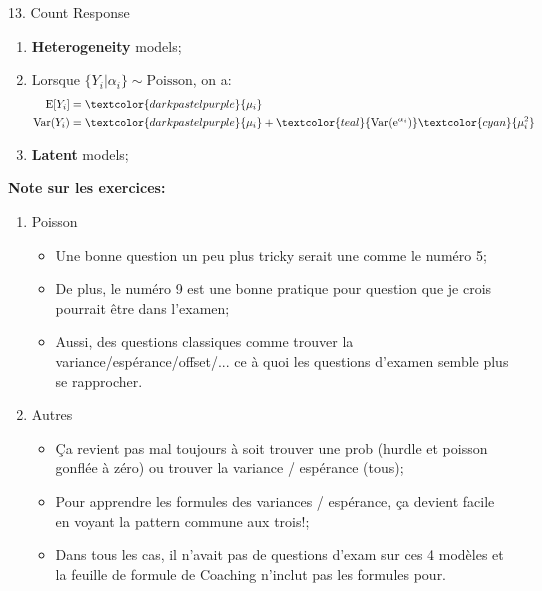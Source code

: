 \documentclass[12pt, titlepage, french]{report}
\begin{document}
\begin{CHPT_SUMM}{13. Count Response}
\begin{enumerate}
\begin{enumerate}
\begin{align*}
			&\text{De plus, on trouve: } \\
			k < 1 &\Rightarrow 1 - k > 0 \therefore \text{Var} > \text{E}	\\
			k > 1 &\Rightarrow 1 - k < 0 \therefore \text{Var} < \text{E}	
		\end{align*}
		où $k = \frac{1 - \pi}{1 - h(0)}$
		\item	\textbf{Heterogeneity} models;
		\item[] Lorsque $\{Y_{i} | \alpha_{i} \} \sim \text{Poisson}$, on a:
		\begin{align*}
			\text{E}[Y_{i}]		&=	\textcolor{darkpastelpurple}{\mu_{i}}	\\
			\text{Var}(Y_{i})	&=	\textcolor{darkpastelpurple}{\mu_{i}} + \textcolor{teal}{\text{Var}(\text{e}^{\alpha_{i}})} \textcolor{cyan}{\mu_{i}^{2}}
		\end{align*}
		\item	\textbf{Latent} models;
	\end{enumerate}
\end{enumerate}
\textbf{Note sur les exercices:} 
\begin{enumerate}
	\item	Poisson
	\begin{itemize}
		\item	Une bonne question un peu plus tricky serait une comme le numéro 5;
		\item	De plus, le numéro 9 est une bonne pratique pour question que je crois pourrait être dans l'examen;
		\item	Aussi, des questions classiques comme trouver la variance/espérance/offset/... ce à quoi les questions d'examen semble plus se rapprocher.
	\end{itemize}
	\item	Autres
	\begin{itemize}
		\item	Ça revient pas mal toujours à soit trouver une prob (hurdle et poisson gonflée à zéro) ou trouver la variance / espérance (tous);
		\item	Pour apprendre les formules des variances / espérance, ça devient facile en voyant la pattern commune aux trois!;
		\item	Dans tous les cas, il n'avait pas de questions d'exam sur ces 4 modèles et la feuille de formule de Coaching n'inclut pas les formules pour.
	\end{itemize}
\end{enumerate}
\end{CHPT_SUMM}
\end{document}
